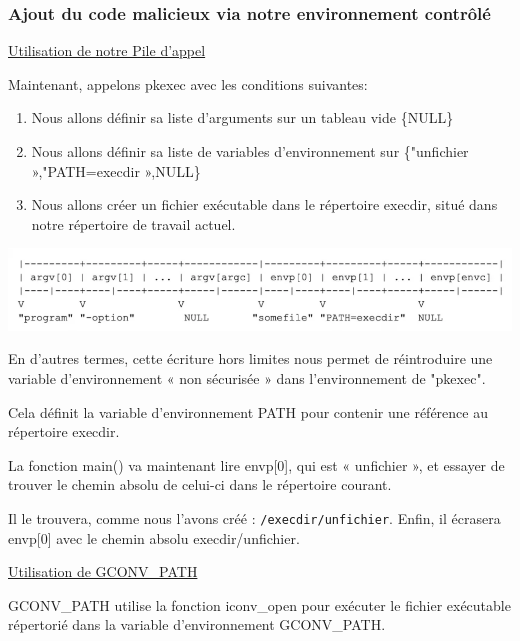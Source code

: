 \documentclass[12pt,a4paper]{article}
\newcommand{\code}[1]{\colorbox{light-gray}{\texttt{#1}}}
\begin{document}
\begin{flushleft}
                \subsubsection{Ajout du code malicieux via notre environnement contrôlé}
                \item \underline{Utilisation de notre Pile d'appel}
                     \item Maintenant, appelons pkexec avec les conditions suivantes:
                     \begin{enumerate}
                         \item Nous allons définir sa liste d’arguments sur un tableau vide \{NULL\}
                         \item Nous allons définir sa liste de variables d’environnement sur \{"unfichier »,"PATH=execdir »,NULL\}
                         \item Nous allons créer un fichier exécutable dans le répertoire execdir, situé dans notre répertoire de travail actuel.
                     \end{enumerate}
                 \begin{center}
                    \includegraphics[scale=0.4]{image} \cite{CVE2021425:online}
                 \end{center}
                \item En d'autres termes, cette écriture hors limites nous permet de réintroduire une variable d’environnement « non sécurisée » dans l'environnement de "pkexec".
                \item Cela définit la variable d’environnement PATH pour contenir une référence au répertoire execdir. 
                \item La fonction main() va maintenant lire envp[0], qui est « unfichier », et essayer de trouver le chemin absolu de celui-ci dans le répertoire courant. 
                \item Il le trouvera, comme nous l’avons créé :  \code{/execdir/unfichier}. Enfin, il écrasera envp[0] avec le chemin absolu execdir/unfichier.
            \item \underline{Utilisation de GCONV\_PATH}
            \item GCONV\_PATH utilise la fonction iconv\_open pour exécuter le fichier exécutable répertorié dans la variable d’environnement GCONV\_PATH.

\end{flushleft}
\end{document}
